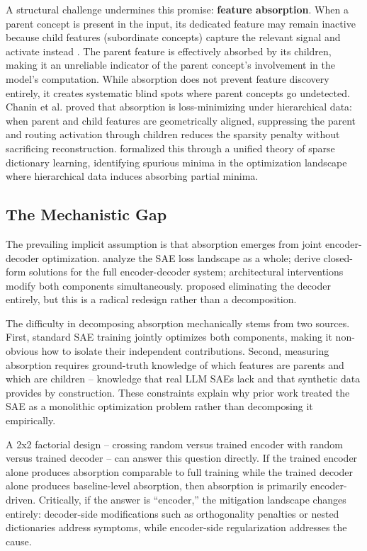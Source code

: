 \documentclass{article}
\begin{document}
A structural challenge undermines this promise: \textbf{feature absorption}. When a parent concept is present in the input, its dedicated feature may remain inactive because child features (subordinate concepts) capture the relevant signal and activate instead \citep{chanin2024}. The parent feature is effectively absorbed by its children, making it an unreliable indicator of the parent concept's involvement in the model's computation. While absorption does not prevent feature discovery entirely, it creates systematic blind spots where parent concepts go undetected. Chanin et al. proved that absorption is loss-minimizing under hierarchical data: when parent and child features are geometrically aligned, suppressing the parent and routing activation through children reduces the sparsity penalty without sacrificing reconstruction. \citet{marks2025} formalized this through a unified theory of sparse dictionary learning, identifying spurious minima in the optimization landscape where hierarchical data induces absorbing partial minima.

\subsection{The Mechanistic Gap}

The prevailing implicit assumption is that absorption emerges from joint encoder-decoder optimization. \citet{marks2025} analyze the SAE loss landscape as a whole; \citet{cui2025} derive closed-form solutions for the full encoder-decoder system; architectural interventions modify both components simultaneously. \citet{oursland2026} proposed eliminating the decoder entirely, but this is a radical redesign rather than a decomposition.

The difficulty in decomposing absorption mechanically stems from two sources. First, standard SAE training jointly optimizes both components, making it non-obvious how to isolate their independent contributions. Second, measuring absorption requires ground-truth knowledge of which features are parents and which are children -- knowledge that real LLM SAEs lack and that synthetic data provides by construction. These constraints explain why prior work treated the SAE as a monolithic optimization problem rather than decomposing it empirically.

A 2x2 factorial design -- crossing random versus trained encoder with random versus trained decoder -- can answer this question directly. If the trained encoder alone produces absorption comparable to full training while the trained decoder alone produces baseline-level absorption, then absorption is primarily encoder-driven. Critically, if the answer is ``encoder,'' the mitigation landscape changes entirely: decoder-side modifications such as orthogonality penalties or nested dictionaries address symptoms, while encoder-side regularization addresses the cause.
\end{document}
